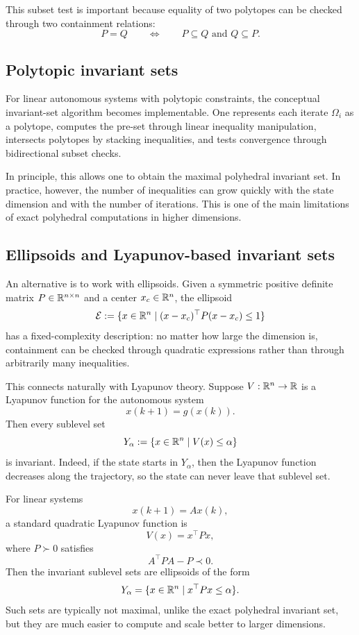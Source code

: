 This subset test is important because equality of two polytopes can be checked through two
containment relations:
\[
P=Q
\qquad \Longleftrightarrow \qquad
P\subseteq Q \text{ and } Q\subseteq P.
\]

\subsection{Polytopic invariant sets}

For linear autonomous systems with polytopic constraints, the conceptual invariant-set algorithm
becomes implementable. One represents each iterate \(\Omega_i\) as a polytope, computes the
pre-set through linear inequality manipulation, intersects polytopes by stacking inequalities, and
tests convergence through bidirectional subset checks.

In principle, this allows one to obtain the maximal polyhedral invariant set. In practice, however,
the number of inequalities can grow quickly with the state dimension and with the number of
iterations. This is one of the main limitations of exact polyhedral computations in higher
dimensions.

\subsection{Ellipsoids and Lyapunov-based invariant sets}

An alternative is to work with ellipsoids. Given a symmetric positive definite matrix \(P\in \mathbb{R}^{n\times n}\)
and a center \(x_c\in \mathbb{R}^n\), the ellipsoid
\[
\mathcal E:=\{x\in \mathbb{R}^n \mid (x-x_c)^\top P (x-x_c)\leq 1\}
\]
has a fixed-complexity description: no matter how large the dimension is, containment can be
checked through quadratic expressions rather than through arbitrarily many inequalities.

This connects naturally with Lyapunov theory. Suppose \(V:\mathbb{R}^n\to \mathbb{R}\) is a Lyapunov function
for the autonomous system
\[
x(k+1)=g(x(k)).
\]
Then every sublevel set
\[
Y_\alpha:=\{x\in \mathbb{R}^n \mid V(x)\leq \alpha\}
\]
is invariant. Indeed, if the state starts in \(Y_\alpha\), then the Lyapunov function decreases along
the trajectory, so the state can never leave that sublevel set.

For linear systems
\[
x(k+1)=Ax(k),
\]
a standard quadratic Lyapunov function is
\[
V(x)=x^\top P x,
\]
where \(P\succ 0\) satisfies
\[
A^\top P A - P \prec 0.
\]
Then the invariant sublevel sets are ellipsoids of the form
\[
Y_\alpha=\{x\in \mathbb{R}^n \mid x^\top P x\leq \alpha\}.
\]
Such sets are typically not maximal, unlike the exact polyhedral invariant set, but they are much
easier to compute and scale better to larger dimensions.

